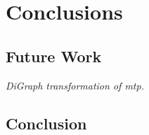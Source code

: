 
\chapter{Conclusions}

\section{Future Work}

\textit{DiGraph transformation of \gls{mtp}.}

\section{Conclusion}


